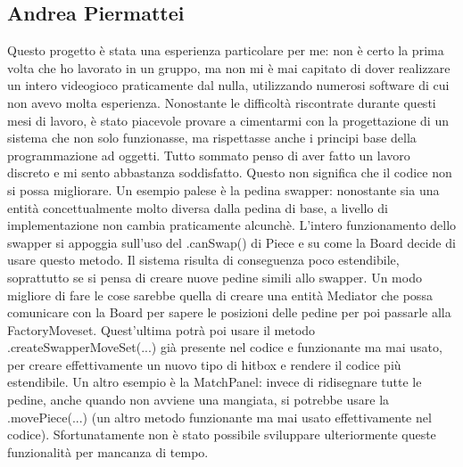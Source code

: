 \documentclass[a4paper,12pt]{report}
\begin{document}
\subsection{Andrea Piermattei}
Questo progetto è stata una esperienza particolare per me: non è certo la prima volta che ho lavorato in un gruppo, ma non mi è mai capitato di dover realizzare un intero videogioco praticamente dal nulla, utilizzando numerosi software di cui non avevo molta esperienza. 
Nonostante le difficoltà riscontrate durante questi mesi di lavoro, è stato piacevole provare a cimentarmi con la progettazione di un sistema che non solo funzionasse, ma rispettasse anche i principi base della programmazione ad oggetti.
Tutto sommato penso di aver fatto un lavoro discreto e mi sento abbastanza soddisfatto.
Questo non significa che il codice non si possa migliorare. Un esempio palese è la pedina swapper: nonostante sia una entità concettualmente molto diversa dalla pedina di base, a livello di implementazione non cambia praticamente alcunchè. L'intero funzionamento dello swapper si appoggia sull'uso del .canSwap() di Piece e su come la Board decide di usare questo metodo. Il sistema risulta di conseguenza poco estendibile, soprattutto se si pensa di creare nuove pedine simili allo swapper. Un modo migliore di fare le cose sarebbe quella di creare una entità Mediator che possa comunicare con la Board per sapere le posizioni delle pedine per poi passarle alla FactoryMoveset. Quest'ultima potrà poi usare il metodo .createSwapperMoveSet(...) già presente nel codice e funzionante ma mai usato, per creare effettivamente un nuovo tipo di hitbox e rendere il codice più estendibile. Un altro esempio è la MatchPanel: invece di ridisegnare tutte le pedine, anche quando non avviene una mangiata, si potrebbe usare la .movePiece(...) (un altro metodo funzionante ma mai usato effettivamente nel codice). Sfortunatamente non è stato possibile sviluppare ulteriormente queste funzionalità per mancanza di tempo.
\end{document}
